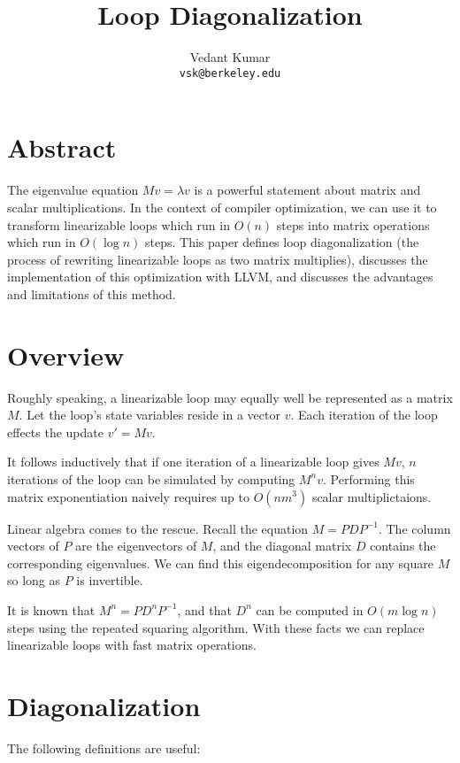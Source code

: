 \documentclass[10pt]{article}
\title{Loop Diagonalization}
\author{Vedant Kumar \\ \texttt{vsk@berkeley.edu}}
\begin{document}
\maketitle

\section{Abstract}

The eigenvalue equation $Mv = \lambda v$ is a powerful statement about
matrix and scalar multiplications. In the context of compiler optimization,
we can use it to transform linearizable loops which run in $O(n)$ steps into
matrix operations which run in $O(\log n)$ steps.  This paper defines loop
diagonalization (the process of rewriting linearizable loops as two
matrix multiplies), discusses the implementation of this optimization
with LLVM, and discusses the advantages and limitations of this method.

\section{Overview}

Roughly speaking, a linearizable loop may equally well be represented as a
matrix $M$. Let the loop's state variables reside in a vector $v$. Each
iteration of the loop effects the update $v' = Mv$.  

It follows inductively that if one iteration of a linearizable loop gives
$Mv$, $n$ iterations of the loop can be simulated by computing $M^n v$.
Performing this matrix exponentiation naively requires up to $O(nm^3)$
scalar multiplictaions.

Linear algebra comes to the rescue. Recall the equation $M = PDP^{-1}$.  The
column vectors of $P$ are the eigenvectors of $M$, and the diagonal matrix
$D$ contains the corresponding eigenvalues. We can find this
eigendecomposition for any square $M$ so long as $P$ is invertible.

It is known that $M^n = PD^nP^{-1}$, and that $D^n$ can be computed in
$O(m\log n)$ steps using the repeated squaring algorithm. With these facts
we can replace linearizable loops with fast matrix operations.

\section{Diagonalization}

The following definitions are useful: \\
\end{document}
